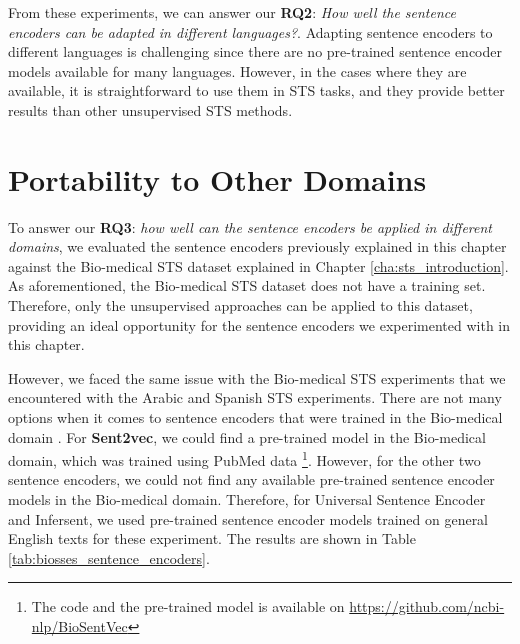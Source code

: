 From these experiments, we can answer our \textbf{RQ2}: \textit{How well the sentence encoders can be adapted in different languages?}. Adapting sentence encoders to different languages is challenging since there are no pre-trained sentence encoder models available for many languages. However, in the cases where they are available, it is straightforward to use them in STS tasks, and they provide better results than other unsupervised STS methods. 


\section{Portability to Other Domains}
\label{sec:sentence_domains}

To answer our \textbf{RQ3}: \textit{how well can the sentence encoders be applied in different domains}, we evaluated the sentence encoders previously explained in this chapter against the Bio-medical STS dataset explained in Chapter \ref{cha:sts_introduction}. As aforementioned, the Bio-medical STS dataset does not have a training set. Therefore, only the unsupervised approaches can be applied to this dataset, providing an ideal opportunity for the sentence encoders we experimented with in this chapter. 

However, we faced the same issue with the Bio-medical STS experiments that we encountered with the Arabic and Spanish STS experiments. There are not many options when it comes to sentence encoders that were trained in the Bio-medical domain \autocite{TAWFIK2020103396}. For \textbf{Sent2vec}, we could find a pre-trained model in the Bio-medical domain, which was trained using PubMed data \autocite{8904728}\footnote{The code and the pre-trained model is available on \url{https://github.com/ncbi-nlp/BioSentVec}}. However, for the other two sentence encoders, we could not find any available pre-trained sentence encoder models in the Bio-medical domain. Therefore, for Universal Sentence Encoder and Infersent, we used pre-trained sentence encoder models trained on general English texts for these experiment. The results are shown in Table \ref{tab:biosses_sentence_encoders}.

